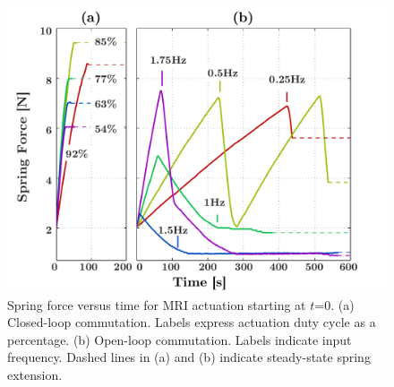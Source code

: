 \documentclass[journal]{IEEEtran}
\begin{document}
\begin{figure}[b]
\begin{center}
	\includegraphics[width=1.0\columnwidth]{Figure14.pdf}
\end{center}
\caption{Spring force versus time for MRI actuation starting at $t$=0. (a) Closed-loop commutation. Labels express actuation duty cycle as a percentage. (b) Open-loop commutation. Labels indicate input frequency. Dashed lines in (a) and (b) indicate steady-state spring extension.} 
\label{fig:force-experiments}
\end{figure}
\end{document}
